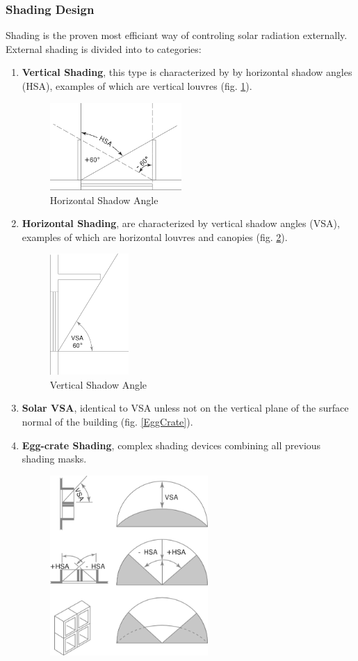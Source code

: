 \documentclass[a4paper,twoside,12pt,openright,final,oldfontcommands]{memoir}
\begin{document}
\subsubsection{Shading Design}
\label{Shading}
Shading is the proven most efficiant way of controling solar radiation externally. External shading
is divided into to categories:
\begin{enumerate}
  \item	\textbf{Vertical Shading}, this type is characterized by by horizontal shadow angles (HSA),
  examples of which are vertical louvres (fig. \ref{HSA}).
\begin{figure}[htbp]
\centering
\includegraphics[width=5cm]{./Images/5-HSA}
\caption[Horizontal Shadow Angle]{Horizontal Shadow Angle \cite{szokolay08}}
\label{HSA}
\end{figure}
  \item \textbf{Horizontal Shading}, are characterized by vertical shadow angles (VSA), examples of
  which are horizontal louvres and canopies (fig. \ref{VSA}).
\begin{figure}[htbp]
\centering
\includegraphics[width=3cm]{./Images/6-VSA}
\caption[Vertical Shadow Angle]{Vertical Shadow Angle \cite{szokolay08}}
\label{VSA}
\end{figure}
  \item \textbf{Solar VSA}, identical to VSA unless not on the vertical plane of the surface normal
  of the building (fig. \ref{EggCrate}).
  \item \textbf{Egg-crate Shading}, complex shading devices combining all previous shading masks.
\begin{figure}[htbp]
\centering
\includegraphics[width=6cm]{./Images/7-Egg-Crate}

\end{figure}
\end{enumerate}
\end{document}
